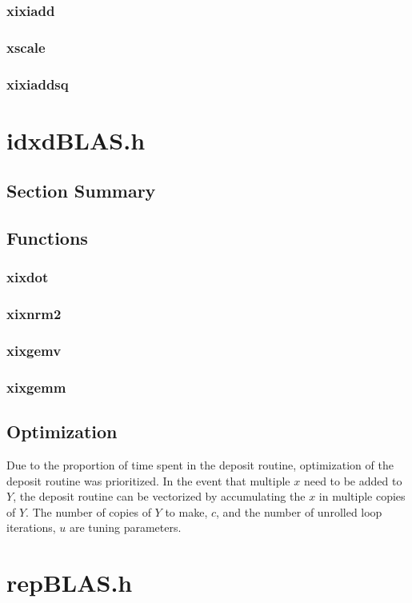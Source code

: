 \documentclass[12pt]{article}
\theoremstyle{definition}
\numberwithin{equation}{section}
\numberwithin{figure}{section}
\begin{document}
    \subsubsection{xixiadd}
    \subsubsection{xscale}
    \subsubsection{xixiaddsq}
\section{idxdBLAS.h}
  \label{sec:idxdBLAS}
  \subsection{Section Summary}
  \subsection{Functions}
    \subsubsection{xixdot}
    \subsubsection{xixnrm2}
    \subsubsection{xixgemv}
    \subsubsection{xixgemm}
  \subsection{Optimization}
    Due to the proportion of time spent in the deposit routine, optimization of the deposit routine was prioritized. In the event that multiple $x$ need to be added to $Y$, the deposit routine can be vectorized by accumulating the $x$ in multiple copies of $Y$. The number of copies of $Y$ to make, $c$, and the number of unrolled loop iterations, $u$ are tuning parameters.
\section{repBLAS.h}
\end{document}
